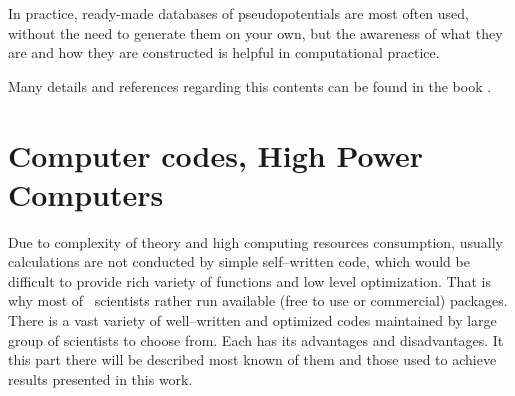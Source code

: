 In practice, ready-made databases of pseudopotentials are most often used, without the need to generate them on your own, but the awareness of what they are and how they are constructed is helpful in computational practice.

Many details and references regarding this contents can be found in the book \cite{martin}.

\ornament
\section{Computer codes, High Power Computers}

Due to complexity of theory and high computing resources consumption, usually calculations are not conducted by simple self--written code, which would be difficult to provide rich variety of functions and low level optimization.
That is why most of \DFT\ scientists rather run available (free to use or commercial) packages.
There is a vast variety of well--written and optimized codes maintained by large group of scientists to choose from.
Each has its advantages and disadvantages.
It this part there will be described most known of them and those used to achieve results presented in this work.



\ornament